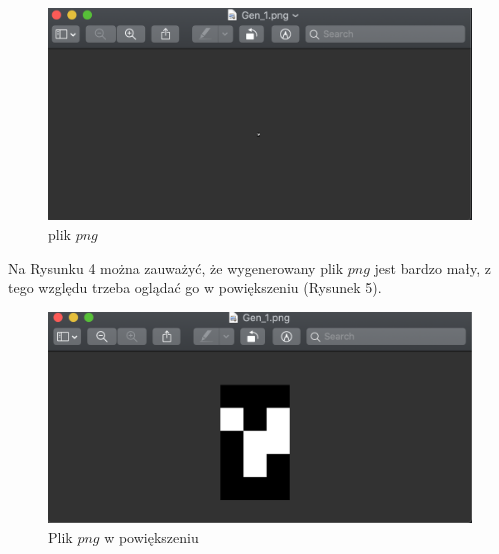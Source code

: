 \documentclass[11pt]{article}
\begin{document}
\begin{figure}[h!]
	\includegraphics[width=\linewidth]{png.png}
	\caption{plik $png$}
	\label{fig:png1}
\end{figure}
Na Rysunku 4 można zauważyć, że wygenerowany plik $png$ jest bardzo mały, z tego względu trzeba oglądać go w powiększeniu (Rysunek 5).\\
\begin{figure}[h!]
	\includegraphics[width=\linewidth]{powiekszenie.png}
	\caption{Plik $png$ w powiększeniu}
\end{figure}
\end{document}
